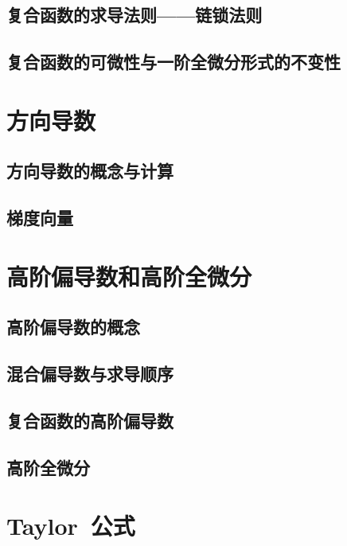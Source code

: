 \subsection{复合函数的求导法则——链锁法则}
\subsection{复合函数的可微性与一阶全微分形式的不变性}
\begin{exercise}
\item
\end{exercise}
\section{方向导数}
\subsection{方向导数的概念与计算}
\subsection{梯度向量}
\begin{exercise}
\item
\end{exercise}
\section{高阶偏导数和高阶全微分}
\subsection{高阶偏导数的概念}
\subsection{混合偏导数与求导顺序}
\subsection{复合函数的高阶偏导数}
\subsection{高阶全微分}
\begin{exercise}
\item
\end{exercise}
\section{Taylor~公式}
\begin{exercise}
\item
\end{exercise}
